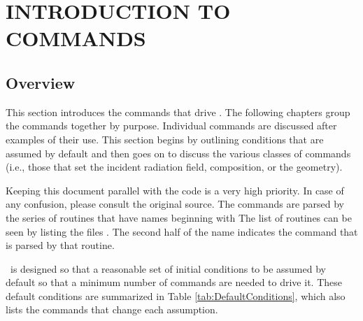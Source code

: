\chapter{INTRODUCTION TO COMMANDS}

\section{Overview}

This section introduces the commands that drive \Cloudy.
The following
chapters group the commands together by purpose.
Individual commands are
discussed after examples of their use.
This section begins by outlining
conditions that are assumed by default and then goes on to discuss the
various classes of commands (i.e., those that set the incident
radiation field, composition, or the geometry).

Keeping this document parallel with the code is a very high priority.
In case of any confusion, please consult the original source.
The commands are
parsed by the series of routines that have names beginning with
The list of routines can be seen by listing the files .
The second
half of the name indicates the command that is parsed by that routine.

\Cloudy\ is designed so that a reasonable set of
initial conditions to be assumed by default so that
a minimum number of commands are needed to drive it.
These default conditions are summarized
in Table \ref{tab:DefaultConditions},
which also lists the
commands that change each assumption.

